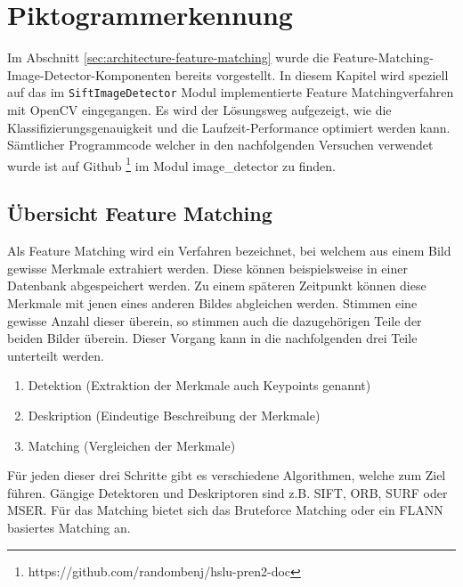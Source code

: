 \newpage

\section{Piktogrammerkennung}
Im Abschnitt \ref{sec:architecture-feature-matching} wurde die Feature-Matching-Image-Detector-Komponenten bereits vorgestellt. In diesem Kapitel wird speziell auf das im \texttt{SiftImageDetector} Modul implementierte Feature Matchingverfahren mit OpenCV eingegangen. Es wird der Lösungsweg aufgezeigt, wie die Klassifizierungsgenauigkeit und die Laufzeit-Performance optimiert werden kann. Sämtlicher Programmcode welcher in den nachfolgenden Versuchen verwendet wurde ist auf Github \footnote{https://github.com/randombenj/hslu-pren2-doc} im Modul image\_detector zu finden.

\subsection{Übersicht Feature Matching}
Als Feature Matching \cite{feature-matching} wird ein Verfahren bezeichnet, bei welchem aus einem Bild gewisse Merkmale extrahiert werden. Diese können beispielsweise in einer Datenbank abgespeichert werden. Zu einem späteren Zeitpunkt können diese Merkmale mit jenen eines anderen Bildes abgleichen werden. Stimmen eine gewisse Anzahl dieser überein, so stimmen auch die dazugehörigen Teile der beiden Bilder überein. Dieser Vorgang kann in die nachfolgenden drei Teile unterteilt werden.

\begin{enumerate}
    \item Detektion (Extraktion der Merkmale auch Keypoints genannt)
    \item Deskription (Eindeutige Beschreibung der Merkmale)
    \item Matching (Vergleichen der Merkmale)
\end{enumerate}

Für jeden dieser drei Schritte gibt es verschiedene Algorithmen, welche zum Ziel führen. Gängige Detektoren und Deskriptoren sind z.B. SIFT, ORB, SURF oder MSER. Für das Matching bietet sich das Bruteforce Matching oder ein FLANN \cite{flann} basiertes Matching an. 

